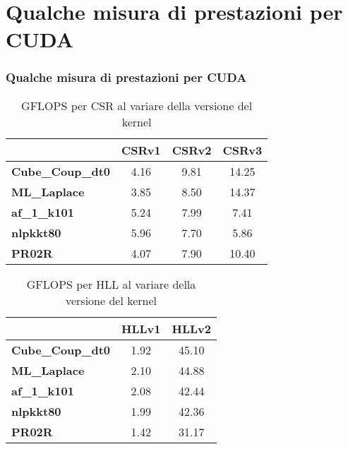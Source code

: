\documentclass{beamer}
\begin{document}
\section{Qualche misura di prestazioni per CUDA}
\begin{frame}
    \frametitle{Qualche misura di prestazioni per CUDA}
    
    \begin{table}
    \centering
    \begin{tabular}{| l | c | c | c |}
    \hline
    & \textbf{CSRv1} & \textbf{CSRv2} & \textbf{CSRv3} \\
    \hline
    \hline
    \textbf{Cube\_Coup\_dt0} & 4.16 & 9.81 & 14.25 \\
    \textbf{ML\_Laplace} & 3.85 & 8.50 & 14.37 \\
    \textbf{af\_1\_k101} & 5.24 & 7.99 & 7.41 \\
    \textbf{nlpkkt80} & 5.96 & 7.70 & 5.86 \\
    \textbf{PR02R} & 4.07 & 7.90 & 10.40 \\
    \hline
    \end{tabular}
    \caption{GFLOPS per CSR al variare della versione del kernel}
    \end{table}
 
    \begin{table}
    \centering
    \begin{tabular}{| l | c | c |}
    \hline
    & \textbf{HLLv1} & \textbf{HLLv2} \\
    \hline
    \hline
    \textbf{Cube\_Coup\_dt0} & 1.92 & 45.10 \\
    \textbf{ML\_Laplace} & 2.10 & 44.88 \\
    \textbf{af\_1\_k101} & 2.08 & 42.44 \\
    \textbf{nlpkkt80} & 1.99 & 42.36 \\
    \textbf{PR02R} & 1.42 & 31.17 \\
    \hline
    \end{tabular}
    \caption{GFLOPS per HLL al variare della versione del kernel}
    \end{table}
\end{frame}
\end{document}
